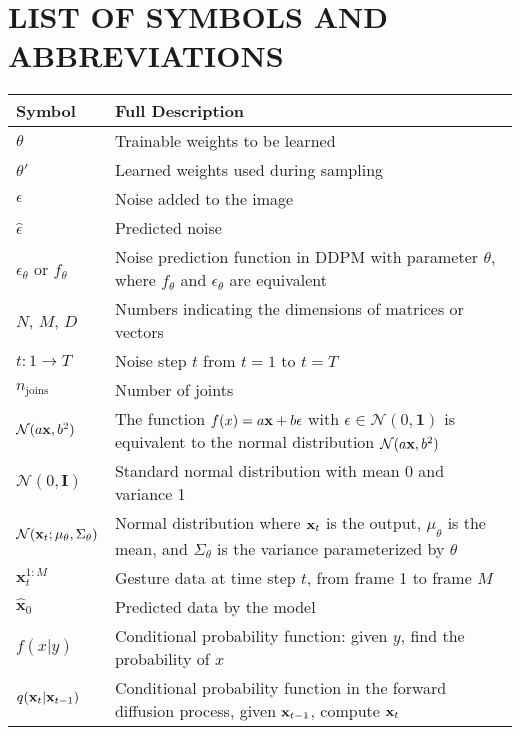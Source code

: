 \pagebreak
{}
{}
\section*{\textbf{ \Large LIST OF SYMBOLS AND ABBREVIATIONS}}

\begin{center}
\begin{tabular}{|p{3cm}|p{12cm}|}
\hline
\textbf{Symbol} & \textbf{Full Description} \\
\hline
$\theta$ & Trainable weights to be learned \\
\hline
$\theta'$ & Learned weights used during sampling \\
\hline
$\epsilon$ & Noise added to the image \\
\hline
$\hat{\epsilon}$ & Predicted noise \\
\hline
$\epsilon_\theta$ or $f_\theta$ & Noise prediction function in DDPM with parameter $\theta$, where $f_\theta$ and $\epsilon_\theta$ are equivalent \\
\hline
$N$, $M$, $D$ & Numbers indicating the dimensions of matrices or vectors \\
\hline
$t: 1 \rightarrow T$ & Noise step $t$ from $t=1$ to $t=T$ \\
\hline
$n_{\operatorname{joins}}$ & Number of joints \\
\hline
$\mathcal{N}(a \mathbf{x}, b^2)$ & The function $f(x) = a \mathbf{x} + b \epsilon$ with $\epsilon \in \mathcal{N}(0, \mathbf{1})$ is equivalent to the normal distribution $\mathcal{N}(a \mathbf{x}, b^2)$ \\
\hline
$\mathcal{N}(0, \mathbf{I})$ & Standard normal distribution with mean 0 and variance 1 \\
\hline
$\mathcal{N}(\mathbf{x}_t; \mu_\theta, \Sigma_\theta)$ & Normal distribution where $\mathbf{x}_t$ is the output, $\mu_\theta$ is the mean, and $\Sigma_\theta$ is the variance parameterized by $\theta$ \\
\hline
$\mathbf{x}_{t}^{1:M}$ & Gesture data at time step $t$, from frame 1 to frame $M$ \\
\hline
$\hat{\mathbf{x}}_0$ & Predicted data by the model \\
\hline
$f(x | y)$ & Conditional probability function: given $y$, find the probability of $x$ \\
\hline
$q(\mathbf{x}_t | \mathbf{x}_{t-1})$ & Conditional probability function in the forward diffusion process, given $\mathbf{x}_{t-1}$, compute $\mathbf{x}_t$ \\

\end{tabular}
\end{center}
